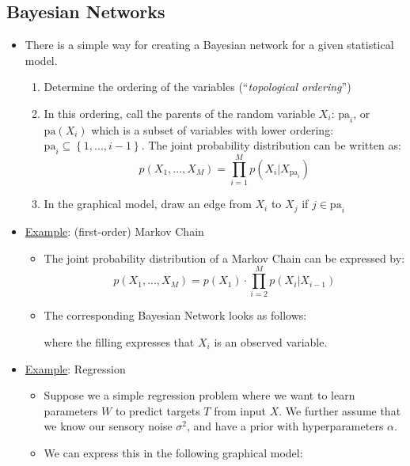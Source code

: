 \subsection{Bayesian Networks}
\begin{itemize}
	\item There is a simple way for creating a Bayesian network for a given statistical model.
	\begin{enumerate}
		\item Determine the ordering of the variables (``\textit{topological ordering}'')
		\item In this ordering, call the parents of the random variable $X_i$: $\text{pa}_i$, or $\text{pa}(X_i)$ which is a subset of variables with lower ordering: $\text{pa}_i \subseteq \left\{1,...,i-1\right\}$. The joint probability distribution can be written as:
		$$p(X_1,...,X_M) = \prod_{i=1}^{M}p(X_i|X_{\text{pa}_i})$$
		\item In the graphical model, draw an edge from $X_i$ to $X_j$ if $j\in \text{pa}_i$
	\end{enumerate}
	\item \underline{Example}: (first-order) Markov Chain
	\begin{itemize}
		\item The joint probability distribution of a Markov Chain can be expressed by:
		$$p(X_1,...,X_M)=p(X_1)\cdot \prod_{i=2}^{M} p(X_i|X_{i-1})$$
		\item The corresponding Bayesian Network looks as follows:
		\begin{figure}[ht!]
			\centering
		\end{figure}
		where the filling expresses that $X_i$ is an observed variable.
	\end{itemize}
	\item \underline{Example}: Regression
	\begin{itemize}
		\item Suppose we a simple regression problem where we want to learn parameters $W$ to predict targets $T$ from input $X$. We further assume that we know our sensory noise $\sigma^2$, and have a prior with hyperparameters $\alpha$.
		\item We can express this in the following graphical model:
		\begin{figure}[ht!]
			\centering
\end{figure}
\end{itemize}
\end{itemize}
